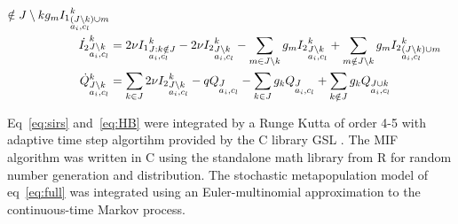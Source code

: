 \documentclass[12pt]{article}
\begin{document}
\begin{footnotesize}
\begin{align}
{  \notin J \setminus k} g_m {I_1}^k_{\begin{subarray}{l} (J \setminus k) \cup m \\ a_i, c_l \end{subarray}}  \notag \\
\dot{I_2}^k_{\begin{subarray}{l}J \setminus k\\ a_i,
    c_l \end{subarray}} &=2 \nu {I_1}^k_{\begin{subarray}{l}J:k
    \notin J\\ a_i, c_l \end{subarray}} -2 \nu {I_2}^k_{\begin{subarray}{l}J \setminus k\\ a_i, c_l \end{subarray}} -\sum_{m
  \in J \setminus k} g_m {I_2}^k_{\begin{subarray}{l}J \setminus k\\ a_i, c_l \end{subarray}} + \sum_{m
  \notin J \setminus k} g_m {I_2}^k_{\begin{subarray}{l} (J \setminus k) \cup m \\ a_i, c_l \end{subarray}} 
\notag \\
\dot{Q}^k_{\begin{subarray}{l}J \setminus k\\ a_i, c_l \end{subarray}}
&= \sum_{k \in J} 2 \nu {I_2}^k_{\begin{subarray}{l}J \setminus k\\
    a_i,
    c_l \end{subarray}} - q Q_{\begin{subarray}{l}J \\
    a_i, c_l \end{subarray}} -\sum_{k \in J} g_k
Q_{\begin{subarray}{l}J\\ a_i, c_l \end{subarray}} + \sum_{k \notin J}
g_k Q_{\begin{subarray}{l}J \cup k \\ a_i, c_l \end{subarray}} \notag
\end{align}
\end{footnotesize}

Eq~\eqref{eq:sirs} and~\eqref{eq:HB} were integrated by a Runge Kutta
of order 4-5 with adaptive time step algortihm provided by the C
library GSL \citep{Galassi2003}.  The MIF algorithm
\citep{Ionides2006} was written in C using the standalone math library
from R \citep{R2008} for random number generation and distribution.
The stochastic metapopulation model of eq~\eqref{eq:full} was
integrated using an Euler-multinomial approximation to the
continuous-time Markov process.
\end{document}
